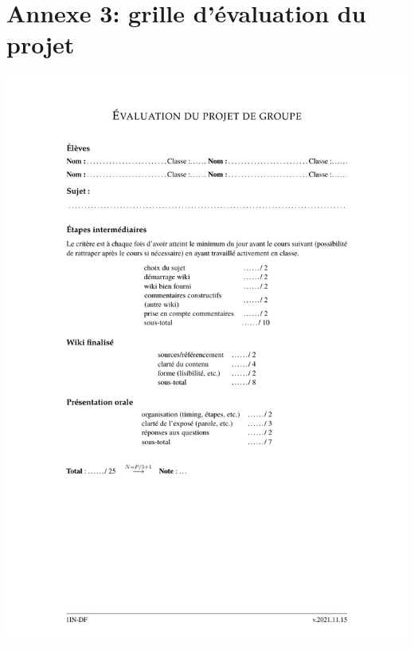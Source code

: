 \documentclass[11pt,bibliography=totoc]{scrartcl}
\begin{document}
\section*{Annexe 3: grille d'évaluation du projet} %
\includegraphics[width=.95\textwidth]{annexes/evaluation.pdf}
\end{document}
